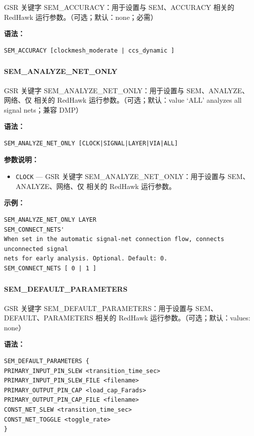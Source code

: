 GSR 关键字 SEM_ACCURACY：用于设置与 SEM、ACCURACY 相关的 RedHawk 运行参数。（可选；默认：none；必需）

\textbf{语法：}
\begin{lstlisting}
SEM_ACCURACY [clockmesh_moderate | ccs_dynamic ]
\end{lstlisting}

\subsubsection{}
\paragraph*{SEM_ANALYZE_NET_ONLY}

GSR 关键字 SEM_ANALYZE_NET_ONLY：用于设置与 SEM、ANALYZE、网络、仅 相关的 RedHawk 运行参数。（可选；默认：value ‘ALL’ analyzes all signal nets；兼容 DMP）

\textbf{语法：}
\begin{lstlisting}
SEM_ANALYZE_NET_ONLY [CLOCK|SIGNAL|LAYER|VIA|ALL]
\end{lstlisting}

\textbf{参数说明：}
\begin{itemize}
\item \texttt{CLOCK} — GSR 关键字 SEM\_ANALYZE\_NET\_ONLY：用于设置与 SEM、ANALYZE、网络、仅 相关的 RedHawk 运行参数。
\end{itemize}

\textbf{示例：}
\begin{lstlisting}
SEM_ANALYZE_NET_ONLY LAYER
SEM_CONNECT_NETS'
When set in the automatic signal-net connection flow, connects unconnected signal
nets for early analysis. Optional. Default: 0.
SEM_CONNECT_NETS [ 0 | 1 ]
\end{lstlisting}

\subsubsection{}
\paragraph*{SEM_DEFAULT_PARAMETERS}

GSR 关键字 SEM_DEFAULT_PARAMETERS：用于设置与 SEM、DEFAULT、PARAMETERS 相关的 RedHawk 运行参数。（可选；默认：values: none）

\textbf{语法：}
\begin{lstlisting}
SEM_DEFAULT_PARAMETERS {
PRIMARY_INPUT_PIN_SLEW <transition_time_sec>
PRIMARY_INPUT_PIN_SLEW_FILE <filename>
PRIMARY_OUTPUT_PIN_CAP <load_cap_Farads>
PRIMARY_OUTPUT_PIN_CAP_FILE <filename>
CONST_NET_SLEW <transition_time_sec>
CONST_NET_TOGGLE <toggle_rate>
}
\end{lstlisting}


